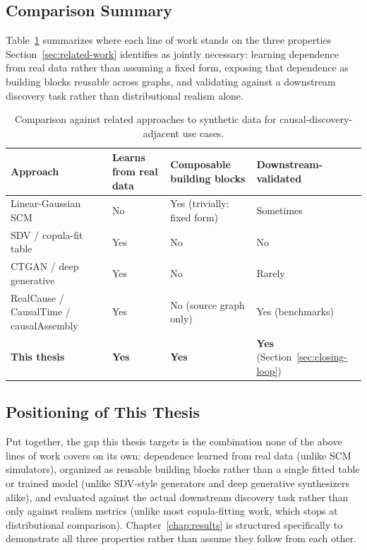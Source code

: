 \documentclass[
  english,
  class=report,
  accentcolor=2c,
  marginpar=false,
  parskip=half-,
  fontsize=11pt,
  ruledheaders=false,
  pdfa=false,
  IMRAD=false,
  thesis={type=master}
]{tudapub}
\begin{document}
\subsection{Comparison Summary}
Table~\ref{tab:related-comparison} summarizes where each line of work
stands on the three properties Section~\ref{sec:related-work} identifies as
jointly necessary: learning dependence from real data rather than assuming
a fixed form, exposing that dependence as building blocks reusable across
graphs, and validating against a downstream discovery task rather than
distributional realism alone.

\begin{table}[ht]
\caption{Comparison against related approaches to synthetic data for causal-discovery-adjacent use cases.}
\label{tab:related-comparison}
\centering
\small
\begin{tabular}{p{2.6cm}p{2.3cm}p{2.9cm}p{3.1cm}}
\toprule
\textbf{Approach} & \textbf{Learns from real data} & \textbf{Composable building blocks} & \textbf{Downstream-validated} \\
\midrule
Linear-Gaussian SCM \parencite{zheng2018} & No & Yes (trivially: fixed form) & Sometimes \\
SDV / copula-fit table \parencite{patki2016} & Yes & No & No \\
CTGAN / deep generative \parencite{xu2019} & Yes & No & Rarely \\
RealCause / CausalTime / causalAssembly \parencite{neal2020,cheng2024,goebler2024} & Yes & No (source graph only) & Yes (benchmarks) \\
\textbf{This thesis} & \textbf{Yes} & \textbf{Yes} & \textbf{Yes} (Section~\ref{sec:closing-loop}) \\
\bottomrule
\end{tabular}
\end{table}

\subsection{Positioning of This Thesis}
Put together, the gap this thesis targets is the combination none of the
above lines of work covers on its own: dependence learned from real
data (unlike SCM simulators), organized as reusable building blocks rather
than a single fitted table or trained model (unlike SDV-style generators
and deep generative synthesizers alike), and evaluated against the actual
downstream discovery task rather than only against realism metrics (unlike
most copula-fitting work, which stops at distributional comparison).
Chapter~\ref{chap:results} is structured specifically to demonstrate all
three properties rather than assume they follow from each other.
\end{document}
